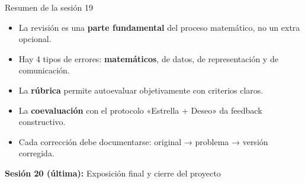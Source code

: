 \documentclass[aspectratio=169, 10pt, spanish]{beamer}
\begin{document}
\begin{frame}{Resumen de la sesión 19}
  \begin{resumenbox}
    \begin{itemize}
      \item La revisión es una \textbf{parte fundamental} del proceso
            matemático, no un extra opcional.
      \item Hay 4 tipos de errores: \textbf{matemáticos},
            de datos, de representación y de comunicación.
      \item La \textbf{rúbrica} permite autoevaluar
            objetivamente con criterios claros.
      \item La \textbf{coevaluación} con el protocolo
            «Estrella + Deseo» da feedback constructivo.
      \item Cada corrección debe documentarse:
            original → problema → versión corregida.
    \end{itemize}
  \end{resumenbox}
  \vspace{6pt}
  \begin{center}
    {\AlmFontSmall\color{AlmAzulM}\faArrowCircleRight\enskip
    \textbf{Sesión 20 (última):}
    Exposición final y cierre del proyecto}
  \end{center}
\end{frame}
\end{document}
